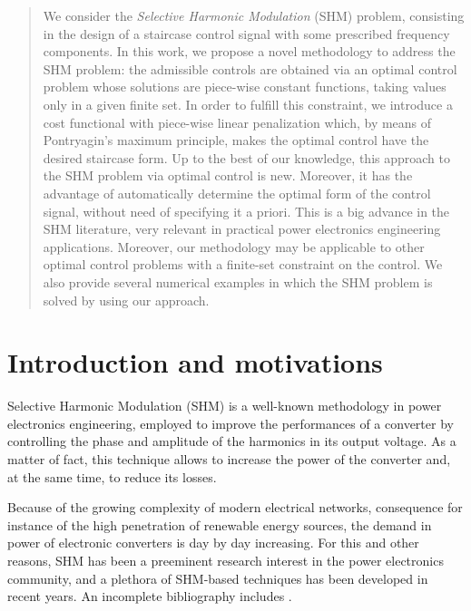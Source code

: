 \documentclass[twocolumn]{autart}    %
\begin{document}
\begin{frontmatter}
\begin{abstract}%
We consider the \emph{Selective Harmonic Modulation} (SHM) problem, consisting in the design of a staircase control signal with some prescribed frequency components. In this work, we propose a novel methodology to  address the SHM problem: the admissible controls are obtained via an optimal control problem whose solutions are piece-wise constant functions, taking values only in a given finite set. In order to fulfill this constraint, we introduce a cost functional with piece-wise linear penalization which, by means of Pontryagin's maximum principle, makes the optimal control have the desired staircase form. Up to the best of our knowledge, this approach to the SHM problem via optimal control is new. Moreover, it has the  advantage of automatically determine the optimal form of the control signal, without need of specifying it a priori. This is a big advance in the SHM literature, very relevant in practical power electronics engineering applications. Moreover, our methodology may be applicable to other optimal control problems with a finite-set constraint on the control. We also provide several numerical examples in which the SHM problem is solved by using our approach.
\end{abstract}

\end{frontmatter}

\section{Introduction and motivations}\label{Section1}

Selective Harmonic Modulation (SHM) \cite{Rodriguez2002} is a well-known methodology in power electronics engineering, employed to improve the performances of a converter by controlling the phase and amplitude of the harmonics in its output voltage. As a matter of fact, this technique allows to increase the power of the converter and, at the same time, to reduce its losses. 

Because of the growing complexity of modern electrical networks, consequence for instance of the high penetration of renewable energy sources, the demand in power of electronic converters is day by day increasing. For this and other reasons, SHM has been a preeminent research interest in the power electronics community, and a plethora of SHM-based techniques has been developed in recent years. An incomplete bibliography includes \cite{duranay2017selective,Janabi2020,Yang2017}.
\end{document}
